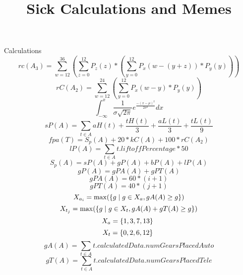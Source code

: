 \documentclass{article}
\title{Sick Calculations and Memes}
\begin{document}
   \maketitle
 	Calculations
 	$$rc(A_3) = \sum_{w=12}^{36} (\sum_{z=0}^{12} P_z(z) * (\sum_{y=0}^{12} P_x(w-(y+z)) * P_y(y)))$$
 	$$rC(A_2) = \sum_{w=12}^{24} (\sum_{y=0}^{12} P_x(w-y) * P_y(y))$$
 	$$\int_{-\infty}^{x} \frac{1}{\sigma\sqrt{2\pi}} e^{\frac{-(x - \mu)^2}{2\sigma^2}} dx$$	
 	$$sP(A) = \sum_{t \in A}^{} aH(t) + \frac{tH(t)}{3} + \frac{aL(t)}{3} + \frac{tL(t)}{9}$$
 	$$fpa(T) = S_p(A) + 20 * kC(A) + 100 * rC(A_2)$$
 	$$lP(A) = \sum_{t \in A}{} t.liftoffPercentage * 50$$
 	$$S_p(A) = sP(A) + gP(A) + bP(A) + lP(A)$$
 	$$gP(A) = gPA(A) + gPT(A)$$
 	$$gPA(A) = 60 * (i + 1)$$
 	$$gPT(A) = 40 * (j + 1)$$
 	$$X_{a_i} = \max(\{\\g \mid g \in X_a, gA(A) \geq g\}\\)$$
 	$$X_{t_j} = \max(\{\\g \mid g \in X_t, gA(A) + gT(A) \geq g\}\\)$$
 	$$X_a = \{\\1, 3, 7, 13 \}\ $$
 	$$X_t = \{\\0, 2, 6, 12 \}\ $$
	$$gA(A) = \sum_{t \in A}{} t.calculatedData.numGearsPlacedAuto$$
	$$gT(A) = \sum_{t \in A}{} t.calculatedData.numGearsPlacedTele$$
\end{document}
